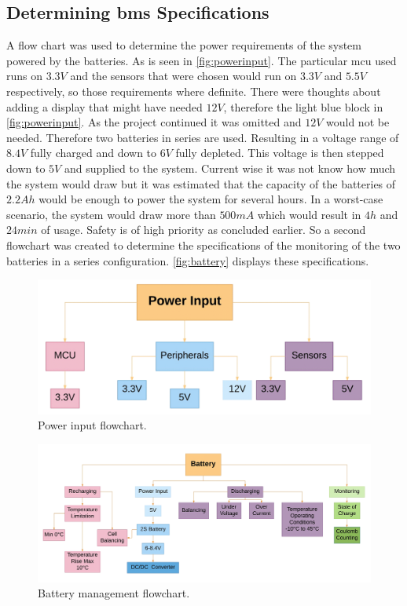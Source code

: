 \subsection{Determining \gls{bms} Specifications}
A flow chart was used to determine the power requirements of the system powered by the batteries. As is seen in \autoref{fig:powerinput}. The particular \gls{mcu} used runs on $3.3V$ and the sensors that were chosen would run on $3.3V$ and $5.5V$ respectively, so those requirements where definite. There were thoughts about adding a display that might have needed $12V$, therefore the light blue block in \autoref{fig:powerinput}. As the project continued it was omitted and $12V$ would not be needed. Therefore two batteries in series are used. Resulting in a voltage range of $8.4V$ fully charged and down to $6V$ fully depleted. This voltage is then stepped down to $5V$ and supplied to the system.
Current wise it was not know how much the system would draw but it was estimated that the capacity of the batteries of $2.2Ah$ would be enough to power the system for several hours.
In a worst-case scenario, the system would draw more than $500mA$ which would result in $4h$ and $24min$ of usage.
Safety is of high priority as concluded earlier. So a second flowchart was created to determine the specifications of the monitoring of the two batteries in a series configuration. \autoref{fig:battery} displays these specifications.

\begin{figure}[H]
	\centering
	\includegraphics[width=\textwidth]{Figures/powerinput.png}
	\caption{Power input flowchart.}
	\label{fig:powerinput}
\end{figure}

\begin{figure}[H]
	\centering
	\includegraphics[width=\textwidth]{Figures/battery.png}
	\caption{Battery management flowchart.}
	\label{fig:battery}
\end{figure}


